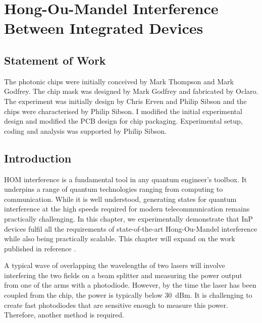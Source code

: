 %
\graphicspath{{./chapters/chapter03/fig03/}}

\let\textcircled=\pgftextcircled
\chapter[HOM Interference Between Integrated Devices]{Hong-Ou-Mandel Interference Between Integrated Devices}
\label{chap:hom}

\section*{Statement of Work}

The photonic chips were initially conceived by Mark Thompson and Mark Godfrey. The chip mask was designed by Mark Godfrey and fabricated by Oclaro. The experiment was initially design by Chris Erven and Philip Sibson and the chips were characterised by Philip Sibson. I modified the initial experimental design and modified the PCB design for chip packaging. Experimental setup, coding and analysis was supported by Philip Sibson. 

\section{Introduction}

\ac{HOM} interference is a fundamental tool in any quantum engineer's toolbox. It underpins a range of quantum technologies ranging from computing to communication. While it is well understood, generating states for quantum interference at the high speeds required for modern telecommunication remains practically challenging. In this chapter, we experimentally demonstrate that \ac{InP} devices fulfil all the requirements of state-of-the-art Hong-Ou-Mandel interference while also being practically scalable. This chapter will expand on the work published in reference \cite{semenenko2019}. 

A typical wave of overlapping the wavelengths of two lasers will involve interfering the two fields on a beam splitter and measuring the power output from one of the arms with a photodiode. However, by the time the laser has been coupled from the chip, the power is typically below \SI{30}{dBm}. It is challenging to create fast photodiodes that are sensitive enough to measure this power. Therefore, another method is required.

